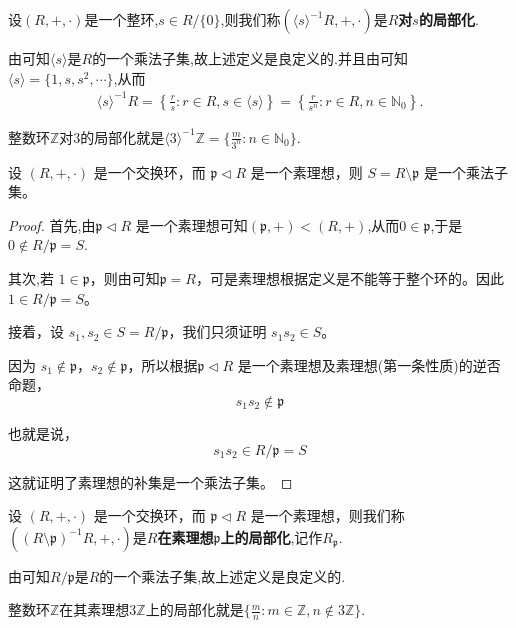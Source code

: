 \documentclass[../../main.tex]{subfiles}
\begin{document}
\begin{definition}
设$(R,+,\cdot)$是一个整环,$s\in R/\{0\}$,则我们称$(\langle s \rangle^{-1}R,+,\cdot)$是\textbf{$R$对$s$的局部化}.
\end{definition}
\begin{remark}
由可知$\langle s \rangle$是$R$的一个乘法子集,故上述定义是良定义的.并且由可知$\langle s \rangle=\{1,s,s^2,\cdots\}$,从而
\begin{align*}
\langle s\rangle ^{-1}R=\left\{ \frac{r}{s}:r\in R,s\in \langle s\rangle \right\} =\left\{ \frac{r}{s^n}:r\in R,n\in \mathbb{N} _0 \right\} .
\end{align*}
\end{remark}
\begin{note}
整数环$\mathbb{Z}$对$3$的局部化就是$\langle 3\rangle^{-1}\mathbb{Z}=\{\frac{m}{3^n}:n\in \mathbb{N}_0\}.$
\end{note}

\begin{lemma}\label{lemma:交换环上的素理想的补集是乘法子集}
设 $(R, +, \cdot)$ 是一个交换环，而 $\mathfrak{p} \lhd  R$ 是一个素理想，则 $S = R \setminus \mathfrak{p}$ 是一个乘法子集。
\end{lemma}
\begin{proof}
首先,由$\mathfrak{p} \lhd  R$ 是一个素理想可知$(\mathfrak{p},+)<(R,+)$,从而$0\in \mathfrak{p}$,于是$0\notin R/\mathfrak{p}=S$.

其次,若 $1 \in \mathfrak{p}$，则由可知$\mathfrak{p} = R$，可是素理想根据定义是不能等于整个环的。因此 $1 \in R/\mathfrak{p}=S$。

接着，设 $s_1, s_2 \in S=R/\mathfrak{p}$，我们只须证明 $s_1s_2 \in S$。

因为 $s_1 \notin \mathfrak{p}$，$s_2 \notin \mathfrak{p}$，所以根据$\mathfrak{p} \lhd  R$ 是一个素理想及素理想(第一条性质)的逆否命题，
\[s_1s_2 \notin \mathfrak{p}\]

也就是说，
\[s_1s_2 \in R/\mathfrak{p}=S\]

这就证明了素理想的补集是一个乘法子集。

\end{proof}

\begin{definition}
设 $(R, +, \cdot)$ 是一个交换环，而 $\mathfrak{p} \lhd  R$ 是一个素理想，则我们称$((R\setminus \mathfrak{p})^{-1}R,+,\cdot)$是\textbf{$R$在素理想$\mathfrak{p}$上的局部化},记作$R_{\mathfrak{p}}.$
\end{definition}
\begin{remark}
由可知$R/\mathfrak{p}$是$R$的一个乘法子集,故上述定义是良定义的.
\end{remark}
\begin{note}
整数环$\mathbb{Z}$在其素理想$3\mathbb{Z}$上的局部化就是$\{\frac{m}{n}:m\in \mathbb{Z},n\notin 3\mathbb{Z}\}.$
\end{note}
\end{document}
